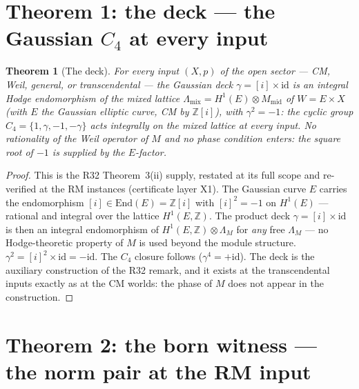 \documentclass[11pt]{article}
\newtheorem{theorem}{Theorem}
\theoremstyle{definition}
\begin{document}
\section{Theorem 1: the deck --- the Gaussian $C_4$ at every input}

\begin{theorem}[The deck]\label{thm:deck}
For every input $(X,p)$ of the open sector --- CM, Weil, general, or
transcendental --- the Gaussian deck
$\gamma=[i]\times\mathrm{id}$ is an integral Hodge endomorphism of the
mixed lattice
$\Lambda_{\mathrm{mix}}=H^1(E)\otimes M_{\mathrm{mid}}$ of
$W=E\times X$ (with $E$ the Gaussian elliptic curve, CM by
$\mathbb{Z}[i]$), with $\gamma^2=-1$: the cyclic group
$C_4=\{1,\gamma,-1,-\gamma\}$ acts integrally on the mixed lattice at
every input. No rationality of the Weil operator of $M$ and no phase
condition enters: the square root of $-1$ is supplied by the $E$-factor.
\end{theorem}

\begin{proof}
This is the R32 Theorem~3(ii) supply, restated at its full scope and
re-verified at the RM instances (certificate layer X1). The Gaussian
curve $E$ carries the endomorphism $[i]\in\mathrm{End}(E)=\mathbb{Z}[i]$
with $[i]^2=-1$ on $H^1(E)$ --- rational and integral over the lattice
$H^1(E,\mathbb{Z})$. The product deck
$\gamma=[i]\times\mathrm{id}$ is then an integral endomorphism of
$H^1(E,\mathbb{Z})\otimes\Lambda_M$ for \emph{any} free $\Lambda_M$ ---
no Hodge-theoretic property of $M$ is used beyond the module structure.
$\gamma^2=[i]^2\times\mathrm{id}=-\mathrm{id}$. The $C_4$ closure
follows ($\gamma^4=+\mathrm{id}$). The deck is the auxiliary
construction of the R32 remark, and it exists at the transcendental
inputs exactly as at the CM worlds: the phase of $M$ does not appear in
the construction.
\end{proof}

\section{Theorem 2: the born witness --- the norm pair at the RM input}
\end{document}
